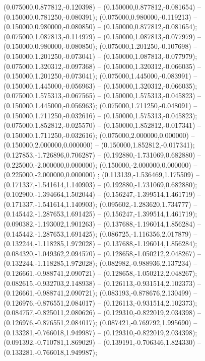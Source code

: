  (0.075000,0.877812,-0.120398) -- (0.150000,0.877812,-0.081654) -- (0.150000,0.781250,-0.080391);
 (0.075000,0.980000,-0.119213) -- (0.150000,0.980000,-0.080850) -- (0.150000,0.877812,-0.081654);
 (0.075000,1.087813,-0.114979) -- (0.150000,1.087813,-0.077979) -- (0.150000,0.980000,-0.080850);
 (0.075000,1.201250,-0.107698) -- (0.150000,1.201250,-0.073041) -- (0.150000,1.087813,-0.077979);
 (0.075000,1.320312,-0.097368) -- (0.150000,1.320312,-0.066035) -- (0.150000,1.201250,-0.073041);
 (0.075000,1.445000,-0.083991) -- (0.150000,1.445000,-0.056963) -- (0.150000,1.320312,-0.066035);
 (0.075000,1.575313,-0.067565) -- (0.150000,1.575313,-0.045823) -- (0.150000,1.445000,-0.056963);
 (0.075000,1.711250,-0.048091) -- (0.150000,1.711250,-0.032616) -- (0.150000,1.575313,-0.045823);
 (0.075000,1.852812,-0.025570) -- (0.150000,1.852812,-0.017341) -- (0.150000,1.711250,-0.032616);
 (0.075000,2.000000,0.000000) -- (0.150000,2.000000,0.000000) -- (0.150000,1.852812,-0.017341);
 (0.127853,-1.726896,0.706287) -- (0.192880,-1.731069,0.682880) -- (0.225000,-2.000000,0.000000);
 (0.150000,-2.000000,0.000000) -- (0.225000,-2.000000,0.000000) ;
 (0.113139,-1.536469,1.175509) -- (0.171337,-1.541614,1.140903) -- (0.192880,-1.731069,0.682880);
 (0.102900,-1.394664,1.502044) -- (0.156247,-1.399514,1.461719) -- (0.171337,-1.541614,1.140903);
 (0.095602,-1.283620,1.734777) -- (0.145442,-1.287653,1.691425) -- (0.156247,-1.399514,1.461719);
 (0.090382,-1.193002,1.901263) -- (0.137688,-1.196014,1.856284) -- (0.145442,-1.287653,1.691425);
 (0.086725,-1.116356,2.017879) -- (0.132244,-1.118285,1.972028) -- (0.137688,-1.196014,1.856284);
 (0.084320,-1.049362,2.094570) -- (0.128658,-1.050212,2.048267) -- (0.132244,-1.118285,1.972028);
 (0.082982,-0.988936,2.137234) -- (0.126661,-0.988741,2.090721) -- (0.128658,-1.050212,2.048267);
 (0.082615,-0.932703,2.148938) -- (0.126113,-0.931514,2.102373) -- (0.126661,-0.988741,2.090721);
 (0.083193,-0.878676,2.130499) -- (0.126976,-0.876551,2.084017) -- (0.126113,-0.931514,2.102373);
 (0.084757,-0.825011,2.080626) -- (0.129310,-0.822019,2.034398) -- (0.126976,-0.876551,2.084017);
 (0.087421,-0.769792,1.995690) -- (0.133281,-0.766018,1.949987) -- (0.129310,-0.822019,2.034398);
 (0.091392,-0.710781,1.869029) -- (0.139191,-0.706346,1.824330) -- (0.133281,-0.766018,1.949987);
